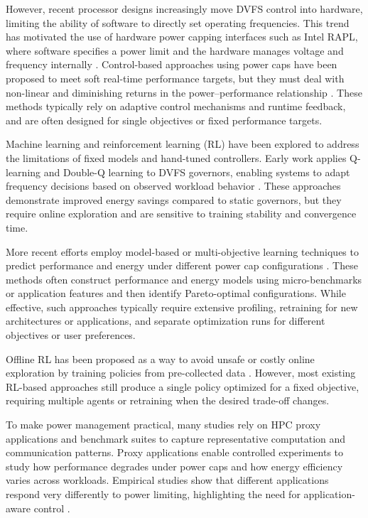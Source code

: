 However, recent processor designs increasingly move DVFS control into hardware, limiting the ability of software to directly set operating frequencies. This trend has motivated the use of hardware power capping interfaces such as Intel RAPL, where software specifies a power limit and the hardware manages voltage and frequency internally \cite{CoPPer}. Control-based approaches using power caps have been proposed to meet soft real-time performance targets, but they must deal with non-linear and diminishing returns in the power–performance relationship \cite{CoPPer}. These methods typically rely on adaptive control mechanisms and runtime feedback, and are often designed for single objectives or fixed performance targets.

Machine learning and reinforcement learning (RL) have been explored to address the limitations of fixed models and hand-tuned controllers. Early work applies Q-learning and Double-Q learning to DVFS governors, enabling systems to adapt frequency decisions based on observed workload behavior \cite{DDQL}. These approaches demonstrate improved energy savings compared to static governors, but they require online exploration and are sensitive to training stability and convergence time.

More recent efforts employ model-based or multi-objective learning techniques to predict performance and energy under different power cap configurations \cite{MOML}. These methods often construct performance and energy models using micro-benchmarks or application features and then identify Pareto-optimal configurations. While effective, such approaches typically require extensive profiling, retraining for new architectures or applications, and separate optimization runs for different objectives or user preferences.

Offline RL has been proposed as a way to avoid unsafe or costly online exploration by training policies from pre-collected data \cite{offlineRL}. However, most existing RL-based approaches still produce a single policy optimized for a fixed objective, requiring multiple agents or retraining when the desired trade-off changes.

To make power management practical, many studies rely on HPC proxy applications and benchmark suites to capture representative computation and communication patterns\cite{MOML,HPC_proxy_applications}. Proxy applications enable controlled experiments to study how performance degrades under power caps and how energy efficiency varies across workloads. Empirical studies show that different applications respond very differently to power limiting, highlighting the need for application-aware control \cite{MOML}.


